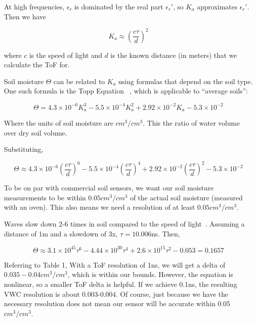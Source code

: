 \documentclass[12pt]{article}
\begin{document}
At high frequencies, $\epsilon_r$ is dominated by the real part
$\epsilon_r'$, so $K_a$ approximates $\epsilon_r'$. Then we have

\begin{equation}
K_a \approx (\frac{c\tau}{d})^2
\end{equation}

where $c$ is the speed of light and $d$ is the known distance (in
meters) that we calculate the ToF for.

Soil moisture $\Theta$ can be related to $K_a$ using formulas that depend on the soil type. One such formula is the Topp Equation ~\cite{Topp1980}, which is applicable to ``average soils'':

\begin{equation}
  \Theta = 4.3\times 10^{-6}K_a^3-5.5\times10^{-4}K_a^2+2.92\times 10^{-2}K_a-5.3\times 10^{-2}
\end{equation}

Where the units of soil moisture are $cm^3/cm^3$. This the ratio of water volume over dry soil volume.

Substituting,

\begin{equation}
  \Theta \approx 4.3\times 10^{-6} (\frac{c\tau}{d})^6-5.5\times10^{-4} (\frac{c\tau}{d})^4+2.92\times 10^{-2} (\frac{c\tau}{d})^2-5.3\times 10^{-2}
\end{equation}

To be on par with commercial soil sensors, we want our soil moisture
measurements to be within $0.05 cm^3/cm^3$ of the actual soil moisture
(measured with an oven). This also means we need a resolution of at
least $0.05 cm^3/cm^3$.

Waves slow down 2-6 times in soil compared to the speed of
light~\cite{gpr}. Assuming a distance of 1m and a slowdown of 3x,
$\tau = 10.006$ns. Then,

\begin{equation}
  \Theta \approx 3.1\times 10^{45}\tau^6-4.44\times 10^{30}\tau^4+2.6\times 10^{15}\tau^2-0.053 = 0.1657
\end{equation}

Referring to Table 1, With a ToF resolution of 1ns, we will get a
delta of $0.035-0.04 cm^3/cm^3$, which is within our bounds. However,
the equation is nonlinear, so a smaller ToF delta is helpful. If we
achieve 0.1ns, the resulting VWC resolution is about 0.003-0.004. Of
course, just because we have the necessary resolution does not mean
our sensor will be accurate within 0.05$cm^3/cm^3$.
\end{document}
